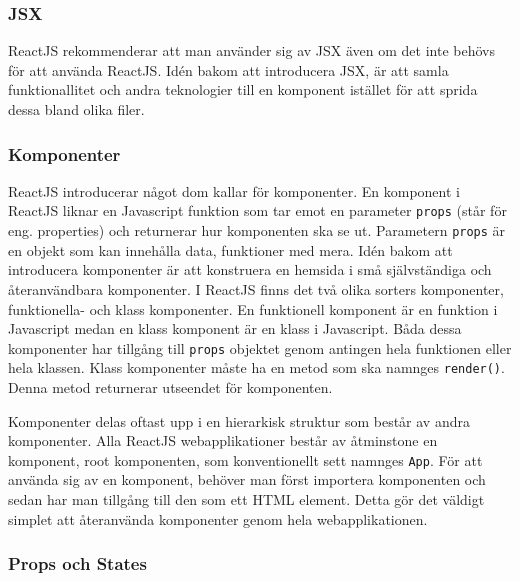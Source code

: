 
\subsubsection{JSX}
ReactJS rekommenderar att man använder sig av JSX även om det inte behövs för att använda ReactJS. Idén bakom att introducera JSX, är att samla funktionallitet och andra teknologier till en komponent istället för att sprida dessa bland olika filer. \cite{react-jsx}


\subsubsection{Komponenter}
ReactJS introducerar något dom kallar för komponenter. En komponent i ReactJS liknar en Javascript funktion som tar emot en parameter \texttt{props} (står för eng. properties) och returnerar hur komponenten ska se ut. Parametern \texttt{props} är en objekt som kan innehålla data, funktioner med mera. Idén bakom att introducera komponenter är att konstruera en hemsida i små självständiga och återanvändbara komponenter. \cite{react-components} I ReactJS finns det två olika sorters komponenter, funktionella- och klass komponenter. En funktionell komponent är en funktion i Javascript medan en klass komponent är en klass i Javascript. Båda dessa komponenter har tillgång till \texttt{props} objektet genom antingen hela funktionen eller hela klassen. Klass komponenter måste ha en metod som ska namnges \texttt{render()}. Denna metod returnerar utseendet för komponenten.

Komponenter delas oftast upp i en hierarkisk struktur som består av andra komponenter. Alla ReactJS webapplikationer består av åtminstone en komponent, root komponenten, som konventionellt sett namnges \texttt{App}. För att använda sig av en komponent, behöver man först importera komponenten och sedan har man tillgång till den som ett HTML element. Detta gör det väldigt simplet att återanvända komponenter genom hela webapplikationen.

\subsubsection{Props och States} 

\pagebreak


